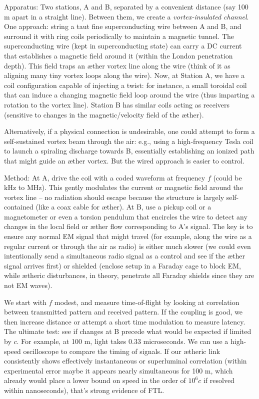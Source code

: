 Apparatus: Two stations, A and B, separated by a convenient distance (say 100 m apart in a straight line). Between them, we create a \textit{vortex-insulated channel}. One approach: string a taut fine superconducting wire between A and B, and surround it with ring coils periodically to maintain a magnetic tunnel. The superconducting wire (kept in superconducting state) can carry a DC current that establishes a magnetic field around it (within the London penetration depth). This field traps an æther vortex line along the wire (think of it as aligning many tiny vortex loops along the wire). Now, at Station A, we have a coil configuration capable of injecting a twist: for instance, a small toroidal coil that can induce a changing magnetic field loop around the wire (thus imparting a rotation to the vortex line). Station B has similar coils acting as receivers (sensitive to changes in the magnetic/velocity field of the æther).


Alternatively, if a physical connection is undesirable, one could attempt to form a self-sustained vortex beam through the air: e.g., using a high-frequency Tesla coil to launch a spiraling discharge towards B, essentially establishing an ionized path that might guide an æther vortex. But the wired approach is easier to control.


Method: At A, drive the coil with a coded waveform at frequency $f$ (could be kHz to MHz). This gently modulates the current or magnetic field around the vortex line – no radiation should escape because the structure is largely self-contained (like a coax cable for æther). At B, use a pickup coil or a magnetometer or even a torsion pendulum that encircles the wire to detect any changes in the local field or æther flow corresponding to A’s signal. The key is to ensure any normal EM signal that might travel (for example, along the wire as a regular current or through the air as radio) is either much slower (we could even intentionally send a simultaneous radio signal as a control and see if the æther signal arrives first) or shielded (enclose setup in a Faraday cage to block EM, while ætheric disturbances, in theory, penetrate all Faraday shields since they are not EM waves).


We start with $f$ modest, and measure time-of-flight by looking at correlation between transmitted pattern and received pattern. If the coupling is good, we then increase distance or attempt a short time modulation to measure latency. The ultimate test: see if changes at B precede what would be expected if limited by $c$. For example, at 100 m, light takes 0.33 microseconds. We can use a high-speed oscilloscope to compare the timing of signals. If our ætheric link consistently shows effectively instantaneous or superluminal correlation (within experimental error maybe it appears nearly simultaneous for 100 m, which already would place a lower bound on speed in the order of $10^6 c$ if resolved within nanoseconds), that’s strong evidence of FTL.



